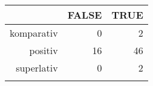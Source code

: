 \begin{tabular}{rrr}
  \lsptoprule
 & FALSE & TRUE \\ 
  \midrule
komparativ & 0 & 2 \\ 
  positiv & 16 & 46 \\ 
  superlativ & 0 & 2 \\ 
   \lspbottomrule
\end{tabular}
